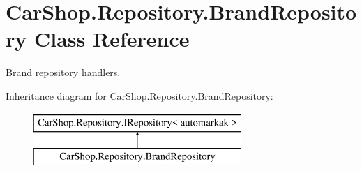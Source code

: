 \hypertarget{class_car_shop_1_1_repository_1_1_brand_repository}{}\section{Car\+Shop.\+Repository.\+Brand\+Repository Class Reference}
\label{class_car_shop_1_1_repository_1_1_brand_repository}


Brand repository handlers.  


Inheritance diagram for Car\+Shop.\+Repository.\+Brand\+Repository\+:\begin{figure}[H]
\begin{center}
\leavevmode
\includegraphics[height=2.000000cm]{class_car_shop_1_1_repository_1_1_brand_repository}
\end{center}
\end{figure}
